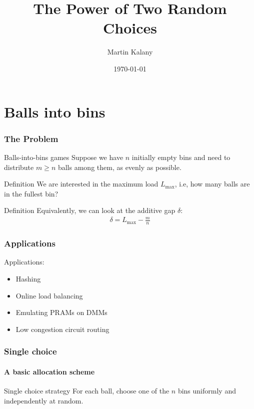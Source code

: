 \documentclass[serif,professionalfonts]{beamer}
\title{The Power of Two Random Choices}
\author[M. Kalany]{Martin Kalany}
\institute[TU Wien]
{
  Graduate student in Computer Science\\
  Vienna University of Technology\\
}
\date{\today}
\newcommand\load{L_{\mathrm{max}}}
\newcommand\scalefac{0.55}
\newcommand\ballsize{5mm}
\newcommand\nrbins{6}
\newcommand\padding{0.1*\ballsize}
\newcommand\bingap{1.6*\balldiameter}
\newcommand\balldiameter{2*\ballsize}
\newcommand\bin[1]{
	\path node[topflat, xshift=#1*\bingap*\scalefac, above, yshift=-\padding*\scalefac]  {};
}
\newcommand\bins{
	\foreach \ibin in {1,...,\nrbins}
		\bin{\ibin};
}
\newcommand\ball[2]{
	\draw let \n1 ={#1#2} in node[circle, minimum size = \ballsize](n\n1) at (#1*\bingap,#2*\balldiameter-\ballsize) {};
	\shade[ballstyle] (#1*\bingap,#2*\balldiameter-\ballsize) circle (\ballsize) {};
}
\newcommand\putinbin[2]{
	\ifnum #2 > 0
		\foreach \nrballs in {1,...,#2}
 			\ball{#1}{\nrballs};
 	\fi
}
\newcounter{index}
\newcommand\balls[1]{%
	\getargsC{#1}%
  	\setcounter{index}{0}%
  	\whiledo{\theindex < \narg}{%
    		\stepcounter{index}%
    		\putinbin{\theindex}{\csname arg\romannumeral\theindex\endcsname}%
  	}%
}
\newcommand\bab[1]{%
	\bins
	\balls{#1}
}
\begin{document}
\begin{frame}
  \titlepage
\end{frame}
\note{}

\begin{comment}
\begin{frame}
    \frametitle{Table of Contents}
    \tableofcontents
\end{frame}
\end{comment}

\section{Balls into bins}
\begin{frame}
\frametitle{The Problem}
\begin{exampleblock}{Balls-into-bins games}
Suppose we have $n$ initially empty bins and need to distribute $m \geq n$ balls among them, \alert{as evenly as possible}. 
\end{exampleblock}

\begin{exampleblock}{Definition}
We are interested in the \alert{maximum load $\load$}, i.e, how many balls are in the fullest bin?
\end{exampleblock}

\begin{exampleblock}{Definition}
Equivalently, we can look at the \alert{additive gap} $\delta$:
\begin{align*}
\delta = \load - \frac{m}{n}
\end{align*}
\end{exampleblock}


\end{frame}

\begin{frame}
\frametitle{Applications}
Applications:
\begin{itemize}
	\item Hashing
	\item Online load balancing
	\item Emulating PRAMs on DMMs
	\item Low congestion circuit routing
\end{itemize}
\end{frame}

\begin{frame}
\frametitle{Single choice}
\framesubtitle{A basic allocation scheme}
\begin{exampleblock}{Single choice strategy}
For each ball, choose one of the $n$ bins uniformly and independently at random.
\end{exampleblock}
\bigskip
\begin{center}
\end{center}
\end{frame}
\end{document}
